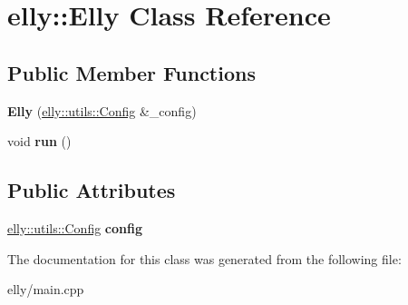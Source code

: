 \hypertarget{classelly_1_1_elly}{\section{elly\-:\-:Elly Class Reference}
\label{classelly_1_1_elly}
}
\subsection*{Public Member Functions}
\begin{DoxyCompactItemize}
\item 
\hypertarget{classelly_1_1_elly_adaa862561882cf1bf4f8a6bab9fe1281}{{\bfseries Elly} (\hyperlink{classelly_1_1utils_1_1_config}{elly\-::utils\-::\-Config} \&\-\_\-config)}\label{classelly_1_1_elly_adaa862561882cf1bf4f8a6bab9fe1281}

\item 
\hypertarget{classelly_1_1_elly_ab0e58e19d3d7fae5a3279ff325cc731d}{void {\bfseries run} ()}\label{classelly_1_1_elly_ab0e58e19d3d7fae5a3279ff325cc731d}

\end{DoxyCompactItemize}
\subsection*{Public Attributes}
\begin{DoxyCompactItemize}
\item 
\hypertarget{classelly_1_1_elly_a2fb996156d9a4afbb89ca74a4f5152a4}{\hyperlink{classelly_1_1utils_1_1_config}{elly\-::utils\-::\-Config} {\bfseries config}}\label{classelly_1_1_elly_a2fb996156d9a4afbb89ca74a4f5152a4}

\end{DoxyCompactItemize}


The documentation for this class was generated from the following file\-:\begin{DoxyCompactItemize}
\item 
elly/main.\-cpp\end{DoxyCompactItemize}
